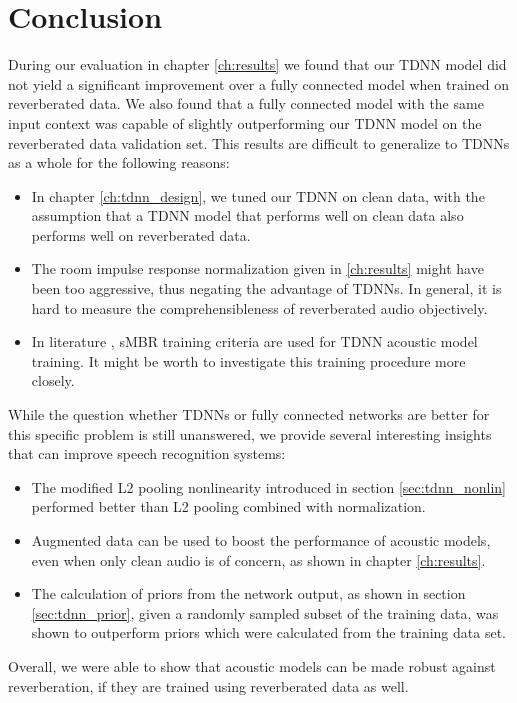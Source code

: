 
\chapter{Conclusion}
\label{ch:Conclusion}
During our evaluation in chapter \ref{ch:results} we found that our TDNN model did not yield a significant improvement over a fully connected model when trained on reverberated data. We also found that a fully connected model with the same input context was capable of slightly outperforming our TDNN model on the reverberated data validation set. This results are difficult to generalize to TDNNs as a whole for the following reasons: 
\begin{itemize}
	\item In chapter \ref{ch:tdnn_design}, we tuned our TDNN on clean data, with the assumption that a TDNN model that performs well on clean data also performs well on reverberated data. 
	\item The room impulse response normalization given in \ref{ch:results} might have been too aggressive, thus negating the advantage of TDNNs. In general, it is hard to measure the comprehensibleness of reverberated audio objectively.  
	\item In literature \cite{peddinti2015jhu} \cite{peddinti2015reverberation}, sMBR training criteria are used for TDNN acoustic model training. It might be worth to investigate this training procedure more closely.  
\end{itemize}
While the question whether TDNNs or fully connected networks are better for this specific problem is still unanswered, we provide several interesting insights that can improve speech recognition systems:
\begin{itemize}
	\item The modified L2 pooling nonlinearity introduced in section \ref{sec:tdnn_nonlin} performed better than L2 pooling combined with normalization.
	\item Augmented data can be used to boost the performance of acoustic models, even when only clean audio is of concern, as shown in chapter \ref{ch:results}.
	\item The calculation of priors from the network output, as shown in section \ref{sec:tdnn_prior}, given a randomly sampled subset of the training data, was shown to outperform priors which were calculated from the training data set. 
\end{itemize}
Overall, we were able to show that acoustic models can be made robust against reverberation, if they are trained using reverberated data as well.
